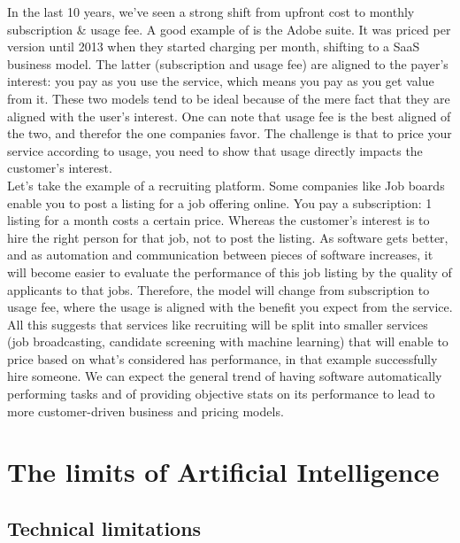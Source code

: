\documentclass[12pt]{article}
\begin{document}
 In the last 10 years, we've seen a strong shift from upfront cost to monthly
subscription \& usage fee. A good example of is the Adobe suite. It was priced
per version until 2013 when they started charging per month, shifting to a SaaS
business model. The latter (subscription and usage fee) are aligned to the
payer's interest: you pay as you use the service, which means you pay as you
get value from it. These two models tend to be ideal because of the mere fact
that they are aligned with the user's interest. One can note that usage fee is
the best aligned of the two, and therefor the one companies favor. The
challenge is that to price your service according to usage, you need to show
that usage directly impacts the customer's interest.\\

 Let's take the example of a recruiting platform. Some companies like Job boards
 enable you to post a listing for a job offering online. You pay a subscription:
 1 listing for a month costs a certain price. Whereas the customer's interest is
 to hire the right person for that job, not to post the listing. As software
 gets better, and as automation and communication between pieces of software
 increases, it will become easier to evaluate the performance of this job
 listing by the quality of applicants to that jobs. Therefore, the model will
 change from subscription to usage fee, where the usage is aligned with the
 benefit you expect from the service. All this suggests that services like
 recruiting will be split into smaller services (job broadcasting, candidate
 screening with machine learning) that will enable to price based on what's
 considered has performance, in that example successfully hire someone. We can
 expect the general trend of having software automatically performing tasks and
 of providing objective stats on its performance to lead to more customer-driven
 business and pricing models.

\pagebreak


\section{The limits of Artificial Intelligence}

\subsection{Technical limitations}
\end{document}
